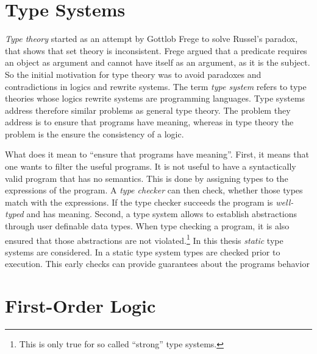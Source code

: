 \section{Type Systems}
\textit{Type theory} started as an attempt by Gottlob Frege to solve Russel's
paradox, that shows that \naive{} set theory is inconsistent. Frege
argued that a predicate requires an object as argument and cannot have
itself as an argument, as it is the subject. So the initial motivation for type theory was to avoid
paradoxes and contradictions in logics and rewrite systems. The term
\textit{type system} refers to type theories whose logics rewrite
systems are programming languages. Type systems address therefore
similar problems as general type theory. The problem they address is
to ensure that programs have meaning, whereas in type theory the
problem is the ensure the consistency of a logic.

What does it mean to ``ensure that programs have meaning''. First, it
means that one wants to filter the useful programs. It is not useful
to have a syntactically valid program that has no semantics. This is
done by assigning types to the expressions of the program. A
\textit{type checker} can then check, whether those types match with
the expressions. If the type checker succeeds the program is
\textit{well-typed} and has meaning. Second, a type system allows to
establish abstractions through user definable data types. When type
checking a program, it is also ensured that those abstractions are not
violated.\footnote{This is only true for so called ``strong'' type
  systems.} In this thesis \textit{static} type systems are
considered. In a static type system types are checked prior to
execution. This early checks can provide guarantees about the programs
behavior 
\section{First-Order Logic}

